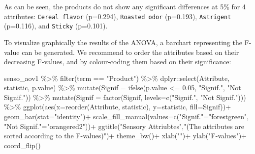 \documentclass[
]{book}
\newenvironment{Shaded}{\begin{snugshade}}{\end{snugshade}}
\newcommand{\AttributeTok}[1]{\textcolor[rgb]{0.77,0.63,0.00}{#1}}
\newcommand{\FloatTok}[1]{\textcolor[rgb]{0.00,0.00,0.81}{#1}}
\newcommand{\FunctionTok}[1]{\textcolor[rgb]{0.00,0.00,0.00}{#1}}
\newcommand{\NormalTok}[1]{#1}
\newcommand{\OtherTok}[1]{\textcolor[rgb]{0.56,0.35,0.01}{#1}}
\newcommand{\SpecialCharTok}[1]{\textcolor[rgb]{0.00,0.00,0.00}{#1}}
\newcommand{\StringTok}[1]{\textcolor[rgb]{0.31,0.60,0.02}{#1}}
\begin{document}
As can be seen, the products do not show any significant differences at 5\% for 4 attributes: \texttt{Cereal\ flavor} (p=0.294), \texttt{Roasted\ odor} (p=0.193), \texttt{Astrigent} (p=0.116), and \texttt{Sticky} (p=0.101).

To visualize graphically the results of the ANOVA, a barchart representing the F-value can be generated. We recommend to order the attributes based on their decreasing F-values, and by colour-coding them based on their significance:

\begin{Shaded}
\begin{Highlighting}[]
\NormalTok{senso\_aov1 }\SpecialCharTok{\%\textgreater{}\%} 
  \FunctionTok{filter}\NormalTok{(term }\SpecialCharTok{==} \StringTok{"Product"}\NormalTok{) }\SpecialCharTok{\%\textgreater{}\%} 
\NormalTok{  dplyr}\SpecialCharTok{::}\FunctionTok{select}\NormalTok{(Attribute, statistic, p.value) }\SpecialCharTok{\%\textgreater{}\%} 
  \FunctionTok{mutate}\NormalTok{(}\AttributeTok{Signif =} \FunctionTok{ifelse}\NormalTok{(p.value }\SpecialCharTok{\textless{}=} \FloatTok{0.05}\NormalTok{, }\StringTok{"Signif."}\NormalTok{, }\StringTok{"Not Signif."}\NormalTok{)) }\SpecialCharTok{\%\textgreater{}\%} 
  \FunctionTok{mutate}\NormalTok{(}\AttributeTok{Signif =} \FunctionTok{factor}\NormalTok{(Signif, }\AttributeTok{levels=}\FunctionTok{c}\NormalTok{(}\StringTok{"Signif."}\NormalTok{, }\StringTok{"Not Signif."}\NormalTok{))) }\SpecialCharTok{\%\textgreater{}\%} 
  \FunctionTok{ggplot}\NormalTok{(}\FunctionTok{aes}\NormalTok{(}\AttributeTok{x=}\FunctionTok{reorder}\NormalTok{(Attribute, statistic), }\AttributeTok{y=}\NormalTok{statistic, }\AttributeTok{fill=}\NormalTok{Signif))}\SpecialCharTok{+}
  \FunctionTok{geom\_bar}\NormalTok{(}\AttributeTok{stat=}\StringTok{"identity"}\NormalTok{)}\SpecialCharTok{+}
  \FunctionTok{scale\_fill\_manual}\NormalTok{(}\AttributeTok{values=}\FunctionTok{c}\NormalTok{(}\StringTok{"Signif."}\OtherTok{=}\StringTok{"forestgreen"}\NormalTok{, }\StringTok{"Not Signif."}\OtherTok{=}\StringTok{"orangered2"}\NormalTok{))}\SpecialCharTok{+}
  \FunctionTok{ggtitle}\NormalTok{(}\StringTok{"Sensory Attriubtes"}\NormalTok{,}\StringTok{"(The attributes are sorted according to the F{-}values)"}\NormalTok{)}\SpecialCharTok{+}
  \FunctionTok{theme\_bw}\NormalTok{()}\SpecialCharTok{+}
  \FunctionTok{xlab}\NormalTok{(}\StringTok{""}\NormalTok{)}\SpecialCharTok{+}
  \FunctionTok{ylab}\NormalTok{(}\StringTok{"F{-}values"}\NormalTok{)}\SpecialCharTok{+}
  \FunctionTok{coord\_flip}\NormalTok{()}
\end{Highlighting}
\end{Shaded}
\end{document}
